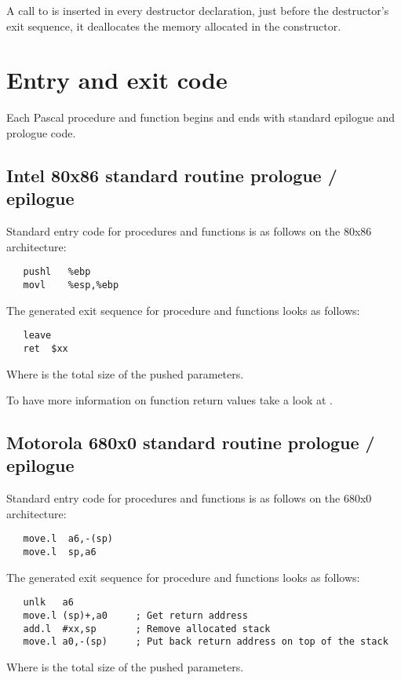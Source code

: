 A call to  is inserted in every destructor declaration,
just before the destructor's exit sequence, it deallocates the memory
allocated in the constructor.



\section{Entry and exit code}

Each Pascal procedure and function begins and ends with standard
epilogue and prologue code.


\subsection{Intel 80x86 standard routine prologue / epilogue}
Standard entry code for procedures and functions is as follows on the
80x86 architecture:
\begin{verbatim}
   pushl   %ebp
   movl    %esp,%ebp
\end{verbatim}

The generated exit sequence for procedure and functions looks as follows:
\begin{verbatim}
   leave
   ret  $xx
\end{verbatim}

Where  is the total size of the pushed parameters.

To have more information on function return values take a look at
.


\subsection{Motorola 680x0 standard routine prologue / epilogue}

Standard entry code for procedures and functions is as follows on the
680x0 architecture:
\begin{verbatim}
   move.l  a6,-(sp)
   move.l  sp,a6
\end{verbatim}

The generated exit sequence for procedure and functions looks as follows:
\begin{verbatim}
   unlk   a6
   move.l (sp)+,a0     ; Get return address
   add.l  #xx,sp       ; Remove allocated stack
   move.l a0,-(sp)     ; Put back return address on top of the stack
\end{verbatim}

Where  is the total size of the pushed parameters.

